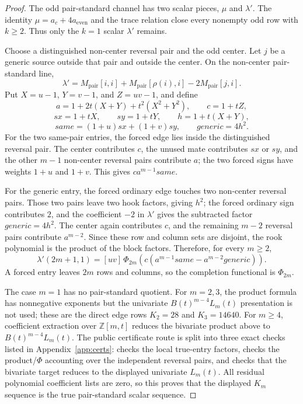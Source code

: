 \begin{proof}
The odd pair-standard channel has two scalar pieces, $\mu$ and $\lambda'$.  The identity
$\mu=a_c+4a_{\mathrm{even}}$ and the trace relation close every nonempty odd row with $k\ge2$.  Thus only the
$k=1$ scalar $\lambda'$ remains.

Choose a distinguished non-center reversal pair and the odd center.  Let $j$ be a generic source outside that pair and outside the center.  On the non-center pair-standard line,
\[
  \lambda'=M_{\mathrm{pair}}[i,i]+M_{\mathrm{pair}}[\rho(i),i]-2M_{\mathrm{pair}}[j,i].
\]
Put $X=u-1$, $Y=v-1$, and $Z=uv-1$, and define
\[
 a=1+2t(X+Y)+t^2(X^2+Y^2),\qquad c=1+tZ,
\]
\[
 sx=1+tX,\qquad sy=1+tY,\qquad h=1+t(X+Y),
\]
\[
 same=(1+u)sx+(1+v)sy,\qquad generic=4h^2.
\]
For the two same-pair entries, the forced edge lies inside the distinguished reversal pair.  The center contributes
$c$, the unused mate contributes $sx$ or $sy$, and the other $m-1$ non-center reversal pairs contribute $a$; the two
forced signs have weights $1+u$ and $1+v$.  This gives $c a^{m-1}same$.

For the generic entry, the forced ordinary edge touches two non-center reversal pairs.  Those two pairs leave two hook
factors, giving $h^2$; the forced ordinary sign contributes $2$, and the coefficient $-2$ in $\lambda'$ gives the
subtracted factor $generic=4h^2$.  The center again contributes $c$, and the remaining $m-2$ reversal pairs contribute
$a^{m-2}$.  Since these row and column sets are disjoint, the rook polynomial is the product of the block factors.
Therefore, for every $m\ge2$,
\[
 \lambda'(2m+1,1)=[uv]\,\Phi_{2m}\left(c\left(a^{m-1}same-a^{m-2}generic\right)\right).
\]
A forced entry leaves $2m$ rows and columns, so the completion functional is $\Phi_{2m}$.

The case $m=1$ has no pair-standard quotient.  For $m=2,3$, the product formula has nonnegative exponents but the
univariate $B(t)^{m-4}L_m(t)$ presentation is not used; these are the direct edge rows $K_2=28$ and $K_3=14640$.
For $m\ge4$, coefficient extraction over $\mathbb Z[m,t]$ reduces the bivariate product above to
$B(t)^{m-4}L_m(t)$.  The public certificate route is split into three exact checks listed in
Appendix~\ref{app:certs}:  checks the local true-entry factors,
 checks the product/$\Phi$ accounting over the independent reversal
pairs, and  checks that the bivariate target reduces to the displayed
univariate $L_m(t)$.  All residual polynomial coefficient lists are zero, so this proves that the displayed $K_m$
sequence is the true pair-standard scalar sequence.
\end{proof}
